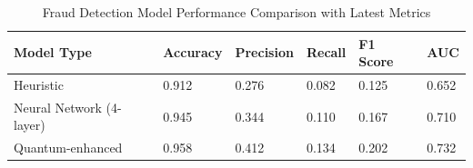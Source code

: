 \begin{table}[!htb]
\centering
\small
\begin{tabular}{|p{3.8cm}|p{2cm}|p{2cm}|p{2cm}|p{2cm}|p{2cm}|}
\hline
\cellcolor{lightblue!30}\textbf{Model Type} & \cellcolor{lightblue!30}\textbf{Accuracy} & \cellcolor{lightblue!30}\textbf{Precision} & \cellcolor{lightblue!30}\textbf{Recall} & \cellcolor{lightblue!30}\textbf{F1 Score} & \cellcolor{lightblue!30}\textbf{AUC} \\
\hline
Heuristic & 0.912 & 0.276 & 0.082 & 0.125 & 0.652 \\
\hline
Neural Network (4-layer) & 0.945 & 0.344 & 0.110 & 0.167 & 0.710 \\
\hline
Quantum-enhanced & 0.958 & 0.412 & 0.134 & 0.202 & 0.732 \\
\hline
\end{tabular}
\caption{Fraud Detection Model Performance Comparison with Latest Metrics}
\label{tab:fraud_performance_latest}
\end{table}